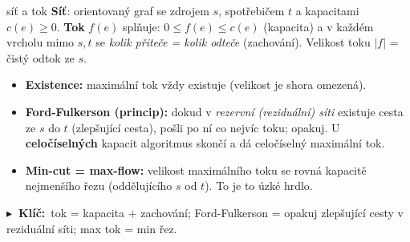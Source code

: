 \documentclass[11pt,a4paper]{article}
\newcommand{\klic}[1]{\par\smallskip\noindent\textbf{\color{defblue}$\blacktriangleright$\ Klíč:}~#1\par\smallskip}
\begin{document}
\begin{defbox}{síť a tok}
\textbf{Síť}: orientovaný graf se zdrojem $s$, spotřebičem $t$ a kapacitami $c(e)\ge 0$.
\textbf{Tok} $f(e)$ splňuje: $0\le f(e)\le c(e)$ (kapacita) a v každém vrcholu mimo $s,t$ se
\emph{kolik přiteče = kolik odteče} (zachování). Velikost toku $|f|$ = čistý odtok ze $s$.
\end{defbox}

\begin{itemize}[leftmargin=1.2em]
  \item \textbf{Existence:} maximální tok vždy existuje (velikost je shora omezená).
  \item \textbf{Ford-Fulkerson (princip):} dokud v \emph{rezervní (reziduální) síti} existuje
  cesta ze $s$ do $t$ (zlepšující cesta), pošli po ní co nejvíc toku; opakuj. U
  \textbf{celočíselných} kapacit algoritmus skončí a dá celočíselný maximální tok.
  \item \textbf{Min-cut = max-flow:} velikost maximálního toku se rovná kapacitě nejmenšího
  řezu (oddělujícího $s$ od $t$). To je to úzké hrdlo.
\end{itemize}
\klic{tok = kapacita + zachování; Ford-Fulkerson = opakuj zlepšující cesty v reziduální síti; max tok = min řez.}
\end{document}
